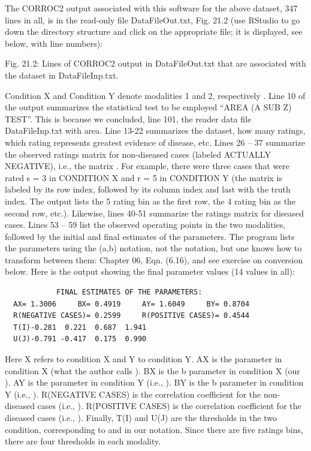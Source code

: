 \documentclass[
]{book}
\begin{document}
The CORROC2 output associated with this software for the above dataset, 347 lines in all, is in the read-only file DataFileOut.txt, Fig. 21.2 (use RStudio to go down the directory structure and click on the appropriate file; it is displayed, see below, with line numbers):

Fig. 21.2: Lines of CORROC2 output in DataFileOut.txt that are associated with the dataset in DataFileInp.txt.

Condition X and Condition Y denote modalities 1 and 2, respectively . Line 10 of the output summarizes the statistical test to be employed ``AREA (A SUB Z) TEST''. This is because we concluded, line 101, the reader data file DataFileInp.txt with area. Line 13-22 summarizes the dataset, how many ratings, which rating represents greatest evidence of disease, etc. Lines 26 -- 37 summarize the observed ratings matrix for non-diseased cases (labeled ACTUALLY NEGATIVE), i.e., the matrix . For example, there were three cases that were rated s = 3 in CONDITION X and r = 5 in CONDITION Y (the matrix is labeled by its row index, followed by its column index and last with the truth index. The output lists the 5 rating bin as the first row, the 4 rating bin as the second row, etc.). Likewise, lines 40-51 summarize the ratings matrix for diseased cases. Lines 53 -- 59 list the observed operating points in the two modalities, followed by the initial and final estimates of the parameters. The program lists the parameters using the (a,b) notation, not the notation, but one knows how to transform between them: Chapter 06, Eqn. (6.16), and see exercise on conversion below. Here is the output showing the final parameter values (14 values in all):

\begin{verbatim}
            FINAL ESTIMATES OF THE PARAMETERS:
  AX= 1.3006     BX= 0.4919     AY= 1.6049     BY= 0.8704
  R(NEGATIVE CASES)= 0.2599     R(POSITIVE CASES)= 0.4544
  T(I)-0.281  0.221  0.687  1.941
  U(J)-0.791 -0.417  0.175  0.990
\end{verbatim}

Here X refers to condition X and Y to condition Y. AX is the parameter in condition X (what the author calls ). BX is the b parameter in condition X (our ). AY is the parameter in condition Y (i.e., ). BY is the b parameter in condition Y (i.e., ). R(NEGATIVE CASES) is the correlation coefficient for the non-diseased cases (i.e., ). R(POSITIVE CASES) is the correlation coefficient for the diseased cases (i.e., ). Finally, T(I) and U(J) are the thresholds in the two condition, corresponding to and in our notation. Since there are five ratings bins, there are four thresholds in each modality.
\end{document}
